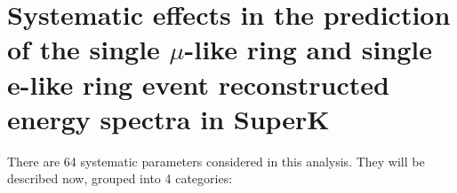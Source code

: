 \clearpage

\section{Systematic effects in the prediction of the single $\mu$-like ring and single e-like ring event reconstructed energy spectra in SuperK}
\label{sec:systematics}

There are 64 systematic parameters considered in this analysis. 
They will be described now, grouped into 4 categories:


